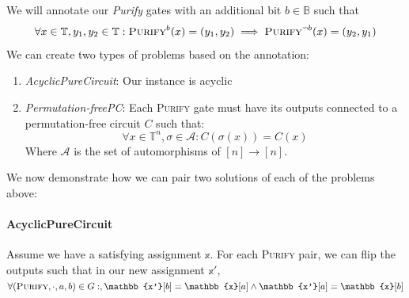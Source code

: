 We will annotate our \textit{Purify} gates with an additional bit $b \in \mathbb{B}$ such that
$$
    \forall x \in \mathbb{T}, y_1, y_2 \in \mathbb{T}: \textsc{Purify}^b(x) = (y_1,y_2) \implies \textsc{Purify}^{\neg {b}}(x) = (y_2, y_1)
$$
We can create two types of problems based on the annotation:
\begin{enumerate}
    \item \textit{AcyclicPureCircuit}: Our instance is acyclic
    \item \textit{Permutation-freePC}: Each \textsc{Purify} gate must have its outputs connected to a permutation-free
          circuit $C$ such that:
          $$
              \forall x \in \mathbb{T}^n, \sigma \in \mathcal{A}: C(\sigma(x)) = C(x)
          $$
          Where $\mathcal{A}$ is the set of automorphisms of $[n] \to [n]$.
\end{enumerate}

We now demonstrate how we can pair two solutions of each of the problems above:
\paragraph*{AcyclicPureCircuit} Assume we have a satisfying assignment $\mathbb{x}$.
For each \textsc{Purify} pair, we can flip the outputs such that in our new assignment $\mathbb{x'}$,
$\forall (\textsc{Purify}, \cdot, a,b) \in G:, \mathbb{x'}[b] =\mathbb{x}[a] \wedge \mathbb{x'}[a]  = \mathbb{x}[b]$



